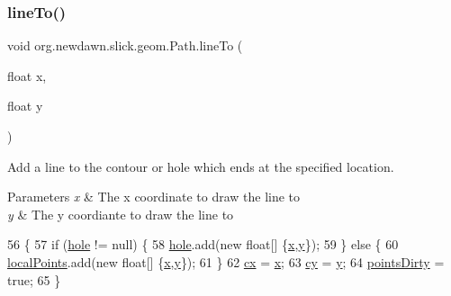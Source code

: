 \subsubsection{\texorpdfstring{line\+To()}{lineTo()}}
{\footnotesize\ttfamily void org.\+newdawn.\+slick.\+geom.\+Path.\+line\+To (\begin{DoxyParamCaption}\item[{float}]{x,  }\item[{float}]{y }\end{DoxyParamCaption})\hspace{0.3cm}{\ttfamily [inline]}}

Add a line to the contour or hole which ends at the specified location.


\begin{DoxyParams}{Parameters}
{\em x} & The x coordinate to draw the line to \\
\hline
{\em y} & The y coordiante to draw the line to \\
\hline
\end{DoxyParams}

\begin{DoxyCode}
56                                          \{
57         \textcolor{keywordflow}{if} (\mbox{\hyperlink{classorg_1_1newdawn_1_1slick_1_1geom_1_1_path_a55b64931dd61b899d51a58c1e969e728}{hole}} != null) \{
58             \mbox{\hyperlink{classorg_1_1newdawn_1_1slick_1_1geom_1_1_path_a55b64931dd61b899d51a58c1e969e728}{hole}}.add(\textcolor{keyword}{new} \textcolor{keywordtype}{float}[] \{\mbox{\hyperlink{classorg_1_1newdawn_1_1slick_1_1geom_1_1_shape_a3e985bfff386c15a4efaad03d8ad60d3}{x}},\mbox{\hyperlink{classorg_1_1newdawn_1_1slick_1_1geom_1_1_shape_a9f934baded6a1b65ebb69e7e5f80ea00}{y}}\});
59         \} \textcolor{keywordflow}{else} \{
60             \mbox{\hyperlink{classorg_1_1newdawn_1_1slick_1_1geom_1_1_path_af67630a074a387ccbe4ea8ad67e013d8}{localPoints}}.add(\textcolor{keyword}{new} \textcolor{keywordtype}{float}[] \{\mbox{\hyperlink{classorg_1_1newdawn_1_1slick_1_1geom_1_1_shape_a3e985bfff386c15a4efaad03d8ad60d3}{x}},\mbox{\hyperlink{classorg_1_1newdawn_1_1slick_1_1geom_1_1_shape_a9f934baded6a1b65ebb69e7e5f80ea00}{y}}\});
61         \}
62         \mbox{\hyperlink{classorg_1_1newdawn_1_1slick_1_1geom_1_1_path_acbc8efe2abb56bf2aa33889ec35a2e3b}{cx}} = \mbox{\hyperlink{classorg_1_1newdawn_1_1slick_1_1geom_1_1_shape_a3e985bfff386c15a4efaad03d8ad60d3}{x}};
63         \mbox{\hyperlink{classorg_1_1newdawn_1_1slick_1_1geom_1_1_path_aecd6f6aaf8fd79b3acec8a24c2fd1a83}{cy}} = \mbox{\hyperlink{classorg_1_1newdawn_1_1slick_1_1geom_1_1_shape_a9f934baded6a1b65ebb69e7e5f80ea00}{y}};
64         \mbox{\hyperlink{classorg_1_1newdawn_1_1slick_1_1geom_1_1_shape_a61fe1954d2fdefc72c34b284f4fcfdb4}{pointsDirty}} = \textcolor{keyword}{true};
65     \}
\end{DoxyCode}
\mbox{\label{classorg_1_1newdawn_1_1slick_1_1geom_1_1_path_a0f2db2e3edd88b4deb26c107473bb8ea}} 
